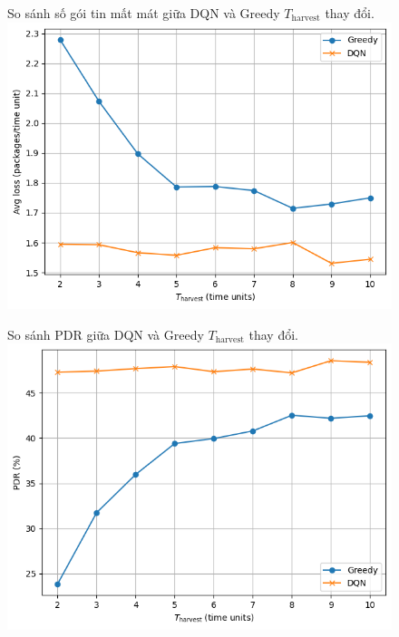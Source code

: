 \documentclass{uetgraduation}
\begin{document}
\begin{figure}{So sánh số gói tin mất mát giữa DQN và Greedy $T_\text{harvest}$ thay đổi.}
    \centering
    \includegraphics[scale=0.8]{t_harvest_loss.png}
    \label{fig:t_loss}
\end{figure}
\begin{figure}{So sánh PDR giữa DQN và Greedy $T_\text{harvest}$ thay đổi.}
    \centering
    \includegraphics[scale=0.8]{t_harvest_pdr.png}
    \label{fig:t_pdr}
\end{figure}
\end{document}

